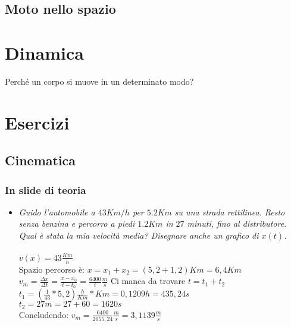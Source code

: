 \documentclass[a4paper,12pt]{report}
\begin{document}
	\section{Moto nello spazio}
	
	\chapter{Dinamica}
	Perché un corpo si muove in un determinato modo?
	\appendix
	\chapter{Esercizi}
	\section{Cinematica}
	\subsection{In slide di teoria}
	\begin{itemize}
		\item \textit{Guido l’automobile a $43 Km/h$ per $5.2 Km$ su una strada rettilinea. Resto senza benzina e 
			percorro a piedi $1.2 Km$ in $27$ minuti, fino al distributore. Qual è stata la mia velocità media? 
			Disegnare anche un grafico di $x(t)$.}\\\\
			$v(x) = 43 \frac{Km}{h}$\\
			Spazio percorso è: $x = x_1 + x_2 = (5,2 + 1,2)Km = 6,4Km$\\
			$v_m = \frac{\Delta x}{\Delta t} = \frac{x- x_0}{t - t_0} = \frac{6400}{t}\frac{m}{s}$ Ci manca da trovare $t = t_1 + t_2$\\
			$t_1 = (\frac{1}{43} * 5,2)\frac{h}{Km} * Km = 0,1209h = 435,24s$\\
			$t_2 = 27m = 27 + 60 = 1620s$\\
			Concludendo: $v_m = \frac{6400}{2055,24}\frac{m}{s} = 3,1139\frac{m}{s}$
	\end{itemize}
	
\end{document}

